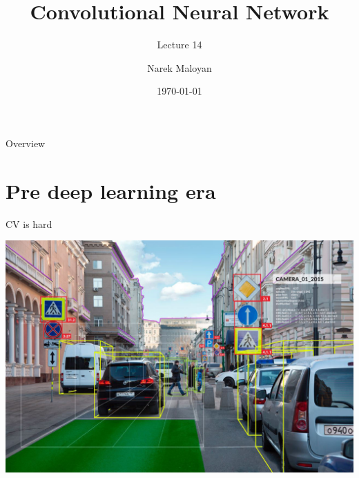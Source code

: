 \documentclass[aspectratio=169,xcolor=dvipsnames]{beamer}
\title[short title]{Convolutional Neural Network}
\subtitle{Lecture 14}
\author[Narek Maloyan] {Narek Maloyan}
\institute[NTU] %
{
    Faculty of Computational Mathematics and Cybernetics \\
    Lomonosov Moscow State University
    \vskip 3pt
}
\date{\today} %
\begin{document}
\begin{frame}
    \titlepage
\end{frame}

\begin{frame}{Overview}
    \tableofcontents
\end{frame}

\section{Pre deep learning era}

\begin{frame}{CV is hard}
    \begin{center}
        \includegraphics[width=\textheight]{../images/moscow.jpeg}
    \end{center}
\end{frame}
\end{document}
